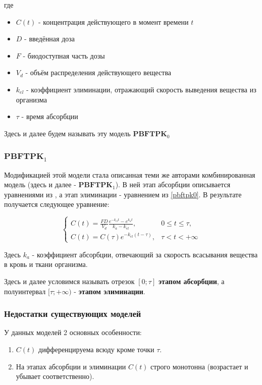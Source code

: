 \documentclass[oneside,senior,etd]{BYUPhys}
\begin{document}
где

\begin{itemize}
	\item $C(t)$ - концентрация действующего в момент времени $t$
	\item $D$ - введённая доза
	\item $F$ - биодоступная часть дозы
	\item $V_d$ - объём распределения действующего вещества
	\item $k_{el}$ - коэффициент элиминации, отражающий скорость выведения вещества из организма
	\item $\tau$ - время абсорбции
\end{itemize}

Здесь и далее будем называть эту модель $\textbf{PBFTPK}_0$

\subsubsection{$\textbf{PBFTPK}_1$} \label{pbftpk1}

Модификацией этой модели стала описанная теми же авторами комбинированная модель (здесь и далее - $\textbf{PBFTPK}_1$). В ней этап абсорбции описывается уравнениями из \cite{dost}, а этап элиминации - уравнением из \ref{pbftpk0}. В результате получается следующее уравнение:

\[
	\begin{cases}
		C(t) = \frac{F D}{V_d} \frac{e^{-k_{el}t} - e^{k_a t}}{k_a - k_{el}}, & 0 \leq t \leq \tau, \\
		C(t) = C(\tau) e^{-k_{el} (t - \tau)},                                & \tau < t < +\infty
	\end{cases}
\]


Здесь $k_a$ - коэффициент абсорбции, отвечающий за скорость всасывания вещества в кровь и ткани организма.

Здесь и далее условимся называть отрезок $[0; \tau]$ \textbf{этапом абсорбции}, а полуинтервал $[\tau; +\infty)$ - \textbf{этапом элиминации}.

\subsubsection{Недостатки существующих моделей}

У данных моделей 2 основных особенности:

\begin{enumerate}
	\item $C(t)$ дифференцируема всюду кроме точки $\tau$.
	\item На этапах абсорбции и элиминации $C(t)$ строго монотонна (возрастает и убывает соответственно).
\end{enumerate}
\end{document}

